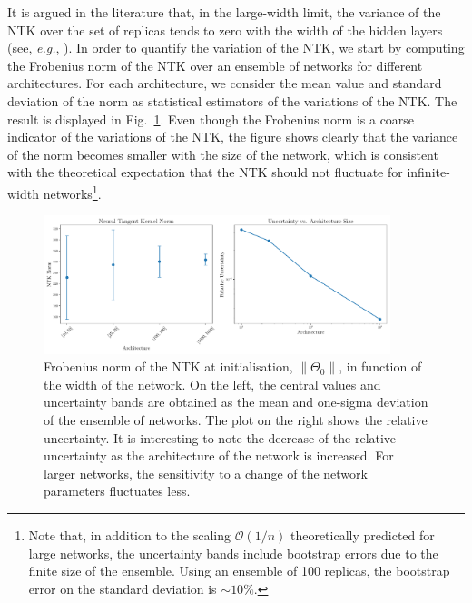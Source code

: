 It is argued in the literature that, in the large-width limit, the variance of
the NTK over the set of replicas tends to zero with the width of the hidden
layers (see, \textit{e.g.}, \cite{Roberts:2021fes}). In order to quantify the
variation of the NTK, we start by computing the Frobenius norm of the NTK over
an ensemble of networks for different architectures. For each architecture, we
consider the mean value and standard deviation of the norm as statistical
estimators of the variations of the NTK. The result is displayed in
Fig.~\ref{fig:NTKInit}. Even though the Frobenius norm is a coarse indicator of
the variations of the NTK, the figure shows clearly that the variance of the
norm becomes smaller with the size of the network, which is consistent with the
theoretical expectation that the NTK should not fluctuate for infinite-width
networks\footnote{Note that, in addition to the scaling $\mathcal{O}(1/n)$
theoretically predicted for large networks, the uncertainty bands include
bootstrap errors due to the finite size of the ensemble. Using an ensemble of
100 replicas, the bootstrap error on the standard deviation is $\sim 10\%$.}.

\begin{figure}[ht!]
  \centering
  \includegraphics[width=0.90\textwidth]{figs/section_3/ntk_initialization_with_uncertainty.pdf}
  \caption{Frobenius norm of the NTK at initialisation, $\lVert \Theta_0
  \rVert$, in function of the width of the network. On the left, the central
  values and uncertainty bands are obtained as the mean and one-sigma deviation
  of the ensemble of networks. The plot on the right shows the relative
  uncertainty. It is interesting to note the decrease of the relative uncertainty as the 
  architecture of the network is increased. For larger networks, the sensitivity to a change
  of the network parameters fluctuates less.}
  \label{fig:NTKInit}
\end{figure}

